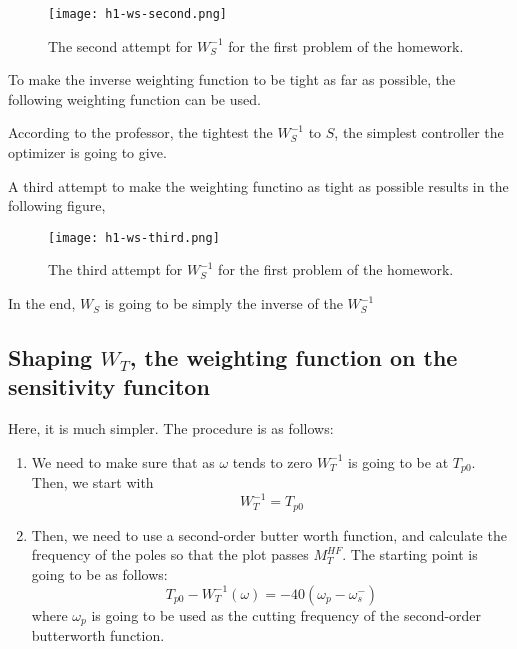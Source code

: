 \begin{figure}[H]
    \centering
    \texttt{[image: h1-ws-second.png]}
    \caption{The second attempt for $W_S^{-1}$ for the first problem of the homework.}
\end{figure}


To make the inverse weighting function to be tight as far as possible, the following weighting function can be used.

\begin{factbox}
According to the professor, the tightest the $W_S^{-1}$ to $S$, the simplest controller the optimizer is going to give.
\end{factbox}

A third attempt to make the weighting functino as tight as possible results in the following figure,

\begin{figure}[H]
    \centering
    \texttt{[image: h1-ws-third.png]}
    \caption{The third attempt for $W_S^{-1}$ for the first problem of the homework.}
\end{figure}

In the end, $W_S$ is going to be simply the inverse of the $W_S^{-1}$

\subsection{Shaping $W_T$, the weighting function on the sensitivity funciton}
Here, it is much simpler. The procedure is as follows:
\begin{enumerate}
    \item We need to make sure that as $\omega$ tends to zero $W_T^{-1}$ is going to be at $T_{p0}$. Then, we start with
    \[
    W_T^{-1} = T_{p0}
    \]
    \item Then, we need to use a second-order butter worth function, and calculate the frequency of the poles so that the plot passes $M_T^{HF}$. The starting point is going to be as follows:
    \[
    T_{p0} - W_T^{-1}(\omega) = -40(\omega_p - \omega_s^{-})
    \]
    where
    $\omega_p$ is going to be used as the cutting frequency of the second-order butterworth function.
    
\end{enumerate}

